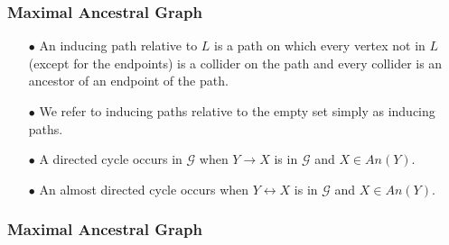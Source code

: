 \documentclass{beamer}
\begin{document}
\begin{frame}
    \frametitle{Maximal Ancestral Graph}
    \begin{itemize}
        \item[$\bullet$] An inducing path relative to $L$ is a path
        on which every vertex not in $L$ (except for the endpoints) is a collider on the path and every collider
        is an ancestor of an endpoint of the path. 
        \item[$\bullet$] We refer to inducing paths relative to the empty set simply as inducing paths. 
        \item[$\bullet$] A directed cycle occurs in $\mathcal{G}$ when $Y\rightarrow X$ is in $\mathcal{G}$ and $X\in An(Y)$. 
        \item[$\bullet$] An almost directed cycle occurs when $Y\leftrightarrow X$ is in $\mathcal{G}$ and $X\in An(Y)$.  
    \end{itemize}
\end{frame}

\begin{frame}
    \frametitle{Maximal Ancestral Graph}
\end{frame}
\end{document}
